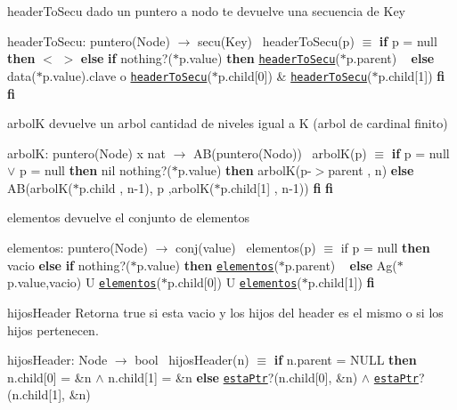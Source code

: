\begin{DoxyParagraph}{header\+To\+Secu}
dado un puntero a nodo te devuelve una secuencia de Key

header\+To\+Secu\+: puntero(\+Node) $\to$ secu(\+Key)~\newline
 header\+To\+Secu(p) $\equiv$ {\bfseries if} p = null {\bfseries then} $<$ $>$ {\bfseries else} {\bfseries if} nothing?($\ast$p.value) {\bfseries then} \href{axiomas.html#headerToSecu}{\tt header\+To\+Secu}($\ast$p.parent) ~\newline
 {\bfseries else} data($\ast$p.value).clave o \href{axiomas.html#headerToSecu}{\tt header\+To\+Secu}($\ast$p.child\mbox{[}0\mbox{]}) \& \href{axiomas.html#headerToSecu}{\tt header\+To\+Secu}($\ast$p.child\mbox{[}1\mbox{]}) {\bfseries fi} {\bfseries fi} 
\end{DoxyParagraph}


\begin{DoxyParagraph}{arbolK}
devuelve un arbol cantidad de niveles igual a K (arbol de cardinal finito)

arbolK\+: puntero(\+Node) x nat $\to$ A\+B(puntero(\+Nodo))~\newline
 arbol\+K(p) $\equiv$ {\bfseries if} p = null $\lor$ p = null {\bfseries then} nil  nothing?($\ast$p.value) {\bfseries then} arbolK(p-\/$>$parent , n) {\bfseries else} ~\newline
 AB(arbolK($\ast$p.child , n-\/1), p ,arbolK($\ast$p.child\mbox{[}1\mbox{]} , n-\/1)) {\bfseries fi} {\bfseries fi} 
\end{DoxyParagraph}


\begin{DoxyParagraph}{elementos}
devuelve el conjunto de elementos

elementos\+: puntero(\+Node) $\to$ conj(value)~\newline
 elementos(p) $\equiv$ if p = null {\bfseries then} vacio {\bfseries else} {\bfseries if} nothing?($\ast$p.value) {\bfseries then} \href{axiomas.html#elementos}{\tt elementos}($\ast$p.parent) ~\newline
 {\bfseries else} Ag($\ast$p.value,vacio) U \href{axiomas.html#elementos}{\tt elementos}($\ast$p.child\mbox{[}0\mbox{]}) U \href{axiomas.html#elementos}{\tt elementos}($\ast$p.child\mbox{[}1\mbox{]}) {\bfseries fi} 
\end{DoxyParagraph}


\begin{DoxyParagraph}{hijos\+Header}
Retorna true si esta vacio y los hijos del header es el mismo o si los hijos pertenecen.

hijos\+Header\+: Node $\to$ bool~\newline
 hijos\+Header(n) $\equiv$ {\bfseries if} n.\+parent = N\+U\+LL {\bfseries then} n.\+child\mbox{[}0\mbox{]} = \&n $\land$ n.\+child\mbox{[}1\mbox{]} = \&n {\bfseries else} \href{axiomas.html#estaPtr}{\tt esta\+Ptr}?(n.\+child\mbox{[}0\mbox{]}, \&n) $\land$ \href{axiomas.html#estaPtr}{\tt esta\+Ptr}?(n.\+child\mbox{[}1\mbox{]}, \&n) 
\end{DoxyParagraph}


